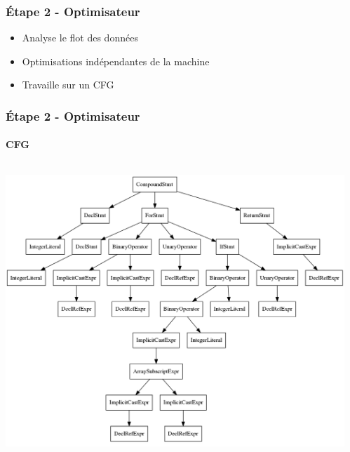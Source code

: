 \documentclass{beamer}
\begin{document}
\begin{frame}
\frametitle{Étape 2 - Optimisateur}
\begin{itemize}
\item Analyse le flot des données
\item Optimisations indépendantes de la machine
\item Travaille sur un CFG
\end{itemize}
\end{frame}

\begin{frame}
\frametitle{Étape 2 - Optimisateur}
\framesubtitle{CFG}
\begin{columns}
\begin{column}{0.5\textwidth}
\colorbox{white}{\includegraphics[scale=0.15]{AST.png}}
\end{column}
\begin{column}{0.5\textwidth}
\begin{center}

\end{center}
\end{column}
\end{columns}
\end{frame}
\end{document}
